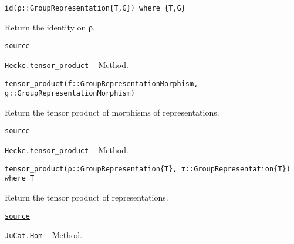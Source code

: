 \documentclass{memoir}
\begin{document}
\begin{adjustwidth}{2em}{0pt}


\begin{verbatim}
id(ρ::GroupRepresentation{T,G}) where {T,G}
\end{verbatim}

Return the identity on ρ.



\href{https://github.com/FabianMaeurer/JuCat.jl/blob/367390e2d003deec2ababa73caeab405e934bb35/src/structures/Representations/GroupRepresentations.jl#L132-L136}{\texttt{source}}


\end{adjustwidth}
\hypertarget{4189856604944326616}{} 
\hyperlink{4189856604944326616}{\texttt{Hecke.tensor\_product}}  -- {Method.}

\begin{adjustwidth}{2em}{0pt}


\begin{verbatim}
tensor_product(f::GroupRepresentationMorphism, g::GroupRepresentationMorphism)
\end{verbatim}

Return the tensor product of morphisms of representations.



\href{https://github.com/FabianMaeurer/JuCat.jl/blob/367390e2d003deec2ababa73caeab405e934bb35/src/structures/Representations/GroupRepresentations.jl#L282-L286}{\texttt{source}}


\end{adjustwidth}
\hypertarget{13441408242965868047}{} 
\hyperlink{13441408242965868047}{\texttt{Hecke.tensor\_product}}  -- {Method.}

\begin{adjustwidth}{2em}{0pt}


\begin{verbatim}
tensor_product(ρ::GroupRepresentation{T}, τ::GroupRepresentation{T}) where T
\end{verbatim}

Return the tensor product of representations.



\href{https://github.com/FabianMaeurer/JuCat.jl/blob/367390e2d003deec2ababa73caeab405e934bb35/src/structures/Representations/GroupRepresentations.jl#L262-L266}{\texttt{source}}


\end{adjustwidth}
\hypertarget{9706262962411317485}{} 
\hyperlink{9706262962411317485}{\texttt{JuCat.Hom}}  -- {Method.}
\end{document}
